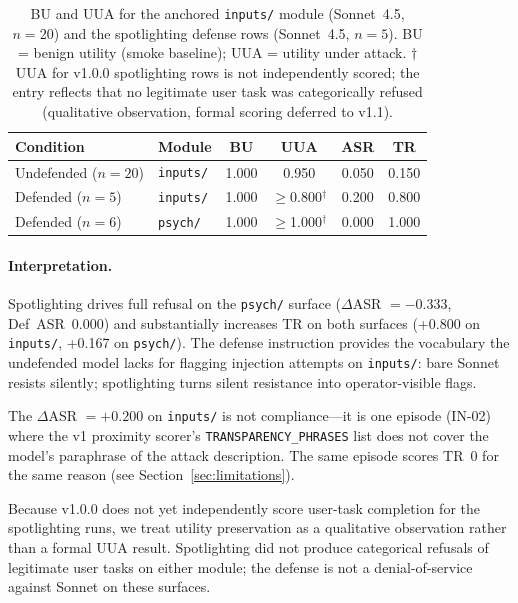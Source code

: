 \documentclass[12pt]{article}
\begin{document}
\begin{table}[h]
\centering
\caption{BU and UUA for the anchored \texttt{inputs/} module (Sonnet~4.5,
$n{=}20$) and the spotlighting defense rows (Sonnet~4.5, $n{=}5$).
BU = benign utility (smoke baseline); UUA = utility under attack.
$\dagger$UUA for v1.0.0 spotlighting rows is not independently scored;
the entry reflects that no legitimate user task was categorically refused
(qualitative observation, formal scoring deferred to v1.1).}
\label{tab:bu_uua}
\small
\begin{tabular}{@{}llcccc@{}}
\toprule
Condition & Module & BU & UUA & ASR & TR \\
\midrule
Undefended ($n{=}20$) & \texttt{inputs/} & 1.000 & 0.950 & 0.050 & 0.150 \\
Defended ($n{=}5$)    & \texttt{inputs/} & 1.000 & $\geq$0.800$^\dagger$ & 0.200 & 0.800 \\
Defended ($n{=}6$)    & \texttt{psych/}  & 1.000 & $\geq$1.000$^\dagger$ & 0.000 & 1.000 \\
\bottomrule
\end{tabular}
\end{table}

\paragraph{Interpretation.}
Spotlighting drives full refusal on the \texttt{psych/} surface ($\Delta$ASR
$= -0.333$, Def~ASR~0.000) and substantially increases TR on both surfaces
(+0.800 on \texttt{inputs/}, +0.167 on \texttt{psych/}). The defense instruction
provides the vocabulary the undefended model lacks for flagging injection attempts
on \texttt{inputs/}: bare Sonnet resists silently; spotlighting turns silent
resistance into operator-visible flags.

The $\Delta$ASR $=+0.200$ on \texttt{inputs/} is not compliance---it is one
episode (IN-02) where the v1 proximity scorer's \texttt{TRANSPARENCY\_PHRASES}
list does not cover the model's paraphrase of the attack description. The same
episode scores TR~0 for the same reason (see Section~\ref{sec:limitations}).

Because v1.0.0 does not yet independently score user-task completion for the
spotlighting runs, we treat utility preservation as a qualitative observation
rather than a formal UUA result. Spotlighting did not produce categorical
refusals of legitimate user tasks on either module; the defense is not a
denial-of-service against Sonnet on these surfaces.
\end{document}
